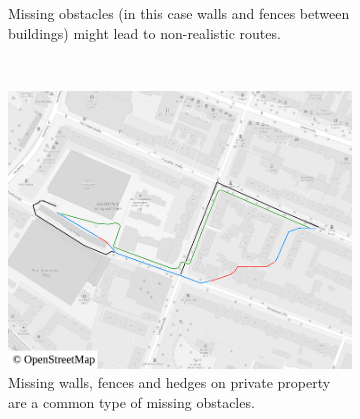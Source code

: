 \begin{figure}[h!]
\begin{minipage}[t]{.48\textwidth}
\begin{subfigure}[t]{\linewidth}
\begin{figcenter}
						\end{figcenter}
						\caption{Missing obstacles (in this case walls and fences between buildings) might lead to non-realistic routes.}
						\label{fig:eval-city-usefulness-b}
					\end{subfigure}
				\end{minipage}
				\\
				\begin{minipage}[t]{.48\textwidth}
					\begin{subfigure}[t]{\linewidth}
						\begin{figcenter}
							\includegraphics[width=\textwidth]{images/qgis-routing-city-routing-6}
						\end{figcenter}
						\caption{Missing walls, fences and hedges on private property are a common type of missing obstacles.}
						\label{fig:eval-city-usefulness-c}
					\end{subfigure}
				\end{minipage}
				\hfill
				\begin{minipage}[t]{.48\textwidth}
					\begin{subfigure}[t]{\linewidth}
						\begin{figcenter}

\end{figcenter}
\end{subfigure}
\end{minipage}
\end{figure}

